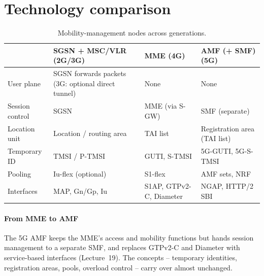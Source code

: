 \documentclass[11pt,a4paper]{article}
\begin{document}
\section{Technology comparison}
\begin{table}[htbp]
\centering\small
\caption{Mobility-management nodes across generations.}\label{tab:cmp}
\begin{tabularx}{\linewidth}{@{}l Y Y Y@{}}
\toprule
{} & SGSN + MSC/VLR (2G/3G) & MME (4G) & AMF (+ SMF) (5G) \\
\midrule
User plane       & SGSN forwards packets (3G: optional direct tunnel) & None & None \\
Session control  & SGSN                        & MME (via S-GW)    & SMF (separate) \\
Location unit    & Location / routing area     & TAI list          & Registration area (TAI list) \\
Temporary ID     & TMSI / P-TMSI               & GUTI, S-TMSI      & 5G-GUTI, 5G-S-TMSI \\
Pooling          & Iu-flex (optional)          & S1-flex           & AMF sets, NRF \\
Interfaces       & MAP, Gn/Gp, Iu              & S1AP, GTPv2-C, Diameter & NGAP, HTTP/2 SBI \\
\bottomrule
\end{tabularx}
\end{table}

\paragraph{From MME to AMF} The 5G AMF keeps the MME's access and mobility functions but hands session
management to a separate SMF, and replaces GTPv2-C and Diameter with service-based interfaces
(Lecture~19). The concepts -- temporary identities, registration areas, pools, overload control -- carry
over almost unchanged.

\end{document}

